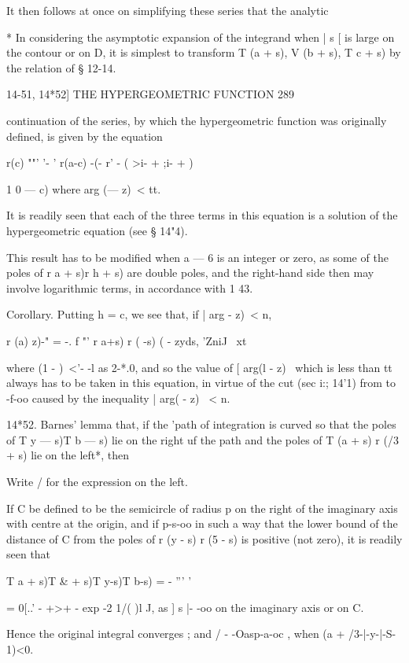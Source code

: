 It then follows at once on simplifying these series that the analytic 

* In considering the asymptotic expansion of the integrand when | s [ is large on the contour 
or on D, it is simplest to transform T (a + s), V (b + s), T c + s) by the relation of § 12-14. 



14-51, 14*52] THE HYPERGEOMETRIC FUNCTION 289 

continuation of the series, by which the hypergeometric function was originally 
defined, is given by the equation 

r(c)  ""' '- '   r(a-c) -(- r' - ( >i-  +  ;i-  +    ) 

1  0 — c) 
where arg (— z)\ <  tt. 

It is readily seen that each of the three terms in this equation is a solution 
of the hypergeometric equation (see § 14"4). 

This result has to be modified when a — 6 is an integer or zero, as some of the poles of 
r a + s)r h + s) are double poles, and the right-hand side then may involve logarithmic 
terms, in accordance with   1 43. 

Corollary. Putting h = c, we see that, if | arg  - z)\ <  n, 

r (a)   z)-" =  -. f "' r  a+s) r ( -s) ( - zyds, 
'ZniJ \ xt 

where (1 - )~<'- -l as 2-*.0, and so the value of [ arg(l - z) \ which is less than tt always 
has to be taken in this equation, in virtue of the cut (sec i:; 14'1) from to -f-oo caused 
by the inequality | arg( - z) \ <  n. 

14*52. Barnes' lemma that, if the 'path of integration is curved so that the poles of 
T  y — s)T b — s) lie on the right uf the path and the poles of T (a + s) r (/3 + s) lie on the left*, 
then 

Write / for the expression on the left. 

If C be defined to be the semicircle of radius p on the right of the imaginary axis with 
centre at the origin, and if p-s-oo in such a way that the lower bound of the distance of 
C from the poles of r (y - s) r (5 - s) is positive (not zero), it is readily seen that 

T a + s)T \& + s)T y-s)T b-s) =  -  ''' '      

= 0[..' - +>+ - exp -2 1/( )l J, 
as ] s |- -oo on the imaginary axis or on C. 

Hence the original integral converges ; and / - -Oasp-a-oc , when (a + /3-|-y-|-S- 1)<0. 

